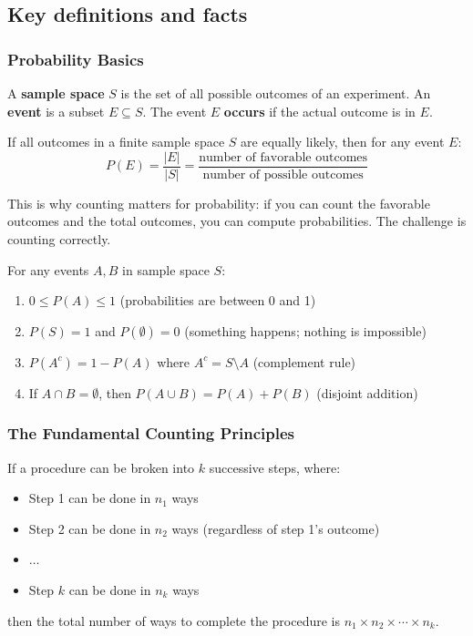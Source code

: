 \subsection*{Key definitions and facts}

\subsubsection*{Probability Basics}

\begin{definition}
A \textbf{sample space} $S$ is the set of all possible outcomes of an experiment. An \textbf{event} is a subset $E \subseteq S$. The event $E$ \textbf{occurs} if the actual outcome is in $E$.
\end{definition}

\begin{definition}
If all outcomes in a finite sample space $S$ are equally likely, then for any event $E$:
\[
P(E) = \frac{|E|}{|S|} = \frac{\text{number of favorable outcomes}}{\text{number of possible outcomes}}
\]
\end{definition}

This is why counting matters for probability: if you can count the favorable outcomes and the total outcomes, you can compute probabilities. The challenge is counting correctly.

\begin{theorem}
For any events $A, B$ in sample space $S$:
\begin{enumerate}
  \item $0 \leq P(A) \leq 1$ (probabilities are between 0 and 1)
  \item $P(S) = 1$ and $P(\emptyset) = 0$ (something happens; nothing is impossible)
  \item $P(A^c) = 1 - P(A)$ where $A^c = S \setminus A$ (complement rule)
  \item If $A \cap B = \emptyset$, then $P(A \cup B) = P(A) + P(B)$ (disjoint addition)
\end{enumerate}
\end{theorem}

\subsubsection*{The Fundamental Counting Principles}

\begin{theorem}
If a procedure can be broken into $k$ successive steps, where:
\begin{itemize}
  \item Step 1 can be done in $n_1$ ways
  \item Step 2 can be done in $n_2$ ways (regardless of step 1's outcome)
  \item $\ldots$
  \item Step $k$ can be done in $n_k$ ways
\end{itemize}
then the total number of ways to complete the procedure is $n_1 \times n_2 \times \cdots \times n_k$.
\end{theorem}

